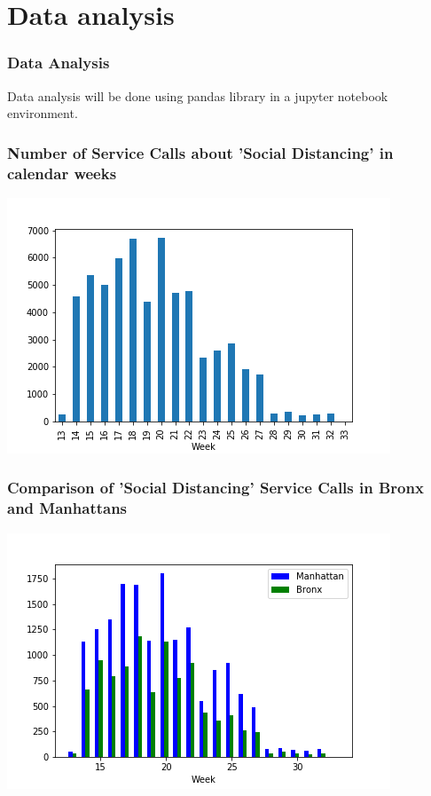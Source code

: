 \documentclass{beamer}
\begin{document}
\section{Data analysis}
\begin{frame}
\frametitle{Data Analysis}
Data analysis will be done using pandas library in a jupyter notebook environment.
\end{frame}
\begin{frame}
\frametitle{Number of Service Calls about 'Social Distancing' in calendar weeks}

\includegraphics[width=\textwidth]{pictures/bar.png}

\end{frame}
\begin{frame}
\frametitle{Comparison of 'Social Distancing' Service Calls in Bronx and Manhattans}

\includegraphics[width=\textwidth]{pictures/comp_bronx_manhattan.png}

\end{frame}
\end{document}
